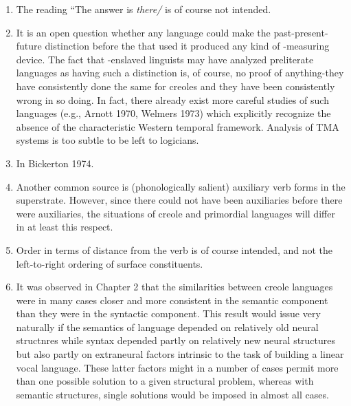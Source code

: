 \begin{enumerate}
\item The reading ``The answer is \textit{ther}\textit{e}\textit{/{\textquotedbl}} is of course not intended.
\item It is an open question whether any language could make the past-present-future distinction before the  that used it produced any kind of -measuring device. The fact that -enslaved linguists may have analyzed preliterate languages as having such a distinction is, of course, no proof of anything-they have consistently done the same for creoles and they have been consistently wrong in so doing. In fact, there already exist more careful studies of such languages (e.g., Arnott 1970, Welmers 1973) which explicitly recognize the absence of the characteristic Western temporal framework. Analysis of TMA systems is too subtle to be left to logicians. 
\item In Bickerton 1974.
\item Another common source is (phonologically salient) auxiliary verb forms in the superstrate. However, since there could not have been auxiliaries before there were auxiliaries, the situations of creole and primordial languages will differ in at least this respect.
\item Order in terms of distance from the verb is of course intended, 
and not the left-to-right ordering of surface constituents. 
\item It was observed in Chapter 2 that the similarities between creole languages were in many cases closer and more consistent in the semantic component than they were in the syntactic component. This result would issue very naturally if the semantics of language depended on relatively old neural structnres while syntax depended partly on relatively new neural structures but also partly on extraneural factors intrinsic to the task of building a linear vocal language. These latter factors might in a number of cases permit more than one possible solution to a given structural problem, whereas with semantic struc\-tures, single solutions would be imposed in almost all cases.
\end{enumerate}

